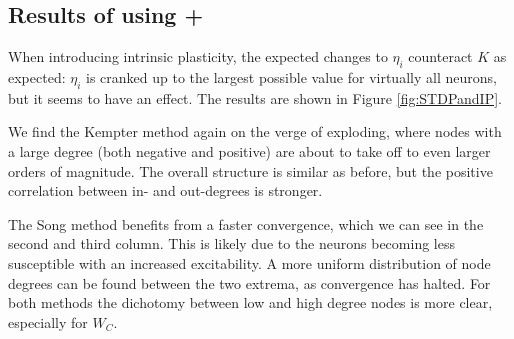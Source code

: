 \subsection{Results of using \STDP + \IP}
When introducing intrinsic plasticity, the expected changes to $\eta_i$ counteract $K$ as expected: $\eta_i$ is cranked up to the largest possible value for virtually all neurons, but it seems to have an effect. The results are shown in Figure \ref{fig:STDPandIP}. 

We find the Kempter method again on the verge of exploding, where nodes with a large degree (both negative and positive) are about to take off to even larger orders of magnitude. The overall structure is similar as before, but the positive correlation between in- and out-degrees is stronger.

The Song method benefits from a faster convergence, which we can see in the second and third column. This is likely due to the neurons becoming less susceptible with an increased excitability. A more uniform distribution of node degrees can be found between the two extrema, as convergence has halted. For both methods the dichotomy between low and high degree nodes is more clear, especially for $W_C$.



